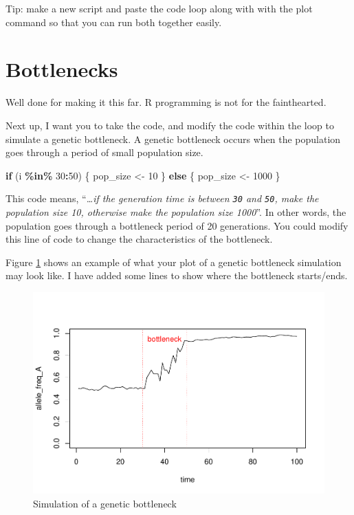 \documentclass[
  a4paper]{book}
\newenvironment{Shaded}{\begin{snugshade}}{\end{snugshade}}
\newcommand{\ControlFlowTok}[1]{\textcolor[rgb]{0.13,0.29,0.53}{\textbf{#1}}}
\newcommand{\DecValTok}[1]{\textcolor[rgb]{0.00,0.00,0.81}{#1}}
\newcommand{\NormalTok}[1]{#1}
\newcommand{\OtherTok}[1]{\textcolor[rgb]{0.56,0.35,0.01}{#1}}
\newcommand{\SpecialCharTok}[1]{\textcolor[rgb]{0.81,0.36,0.00}{\textbf{#1}}}
\begin{document}
\begin{do-something}
Tip: make a new script and paste the code loop along with with the plot
command so that you can run both together easily.
\end{do-something}

\section{Bottlenecks}\label{bottlenecks}

Well done for making it this far. R programming is not for the fainthearted.

Next up, I want you to take the code, and modify the code within the loop to simulate a genetic bottleneck. A genetic bottleneck occurs when the population goes through a period of small population size.

\begin{Shaded}
\begin{Highlighting}[]
\ControlFlowTok{if}\NormalTok{ (i }\SpecialCharTok{\%in\%} \DecValTok{30}\SpecialCharTok{:}\DecValTok{50}\NormalTok{) \{}
\NormalTok{  pop\_size }\OtherTok{\textless{}{-}} \DecValTok{10}
\NormalTok{\} }\ControlFlowTok{else}\NormalTok{ \{}
\NormalTok{  pop\_size }\OtherTok{\textless{}{-}} \DecValTok{1000}
\NormalTok{\}}
\end{Highlighting}
\end{Shaded}

This code means, ``\emph{\ldots if the generation time is between \texttt{30} and \texttt{50}, make the population size 10, otherwise make the population size 1000}''. In other words, the population goes through a bottleneck period of 20 generations. You could modify this line of code to change the characteristics of the bottleneck.

Figure \ref{fig:bottlenecksimulationplot} shows an example of what your plot of a genetic bottleneck simulation may look like. I have added some lines to show where the bottleneck starts/ends.

\begin{figure}
\centering
\includegraphics{BB512_files/figure-latex/bottlenecksimulationplot-1.pdf}
\caption{\label{fig:bottlenecksimulationplot}Simulation of a genetic bottleneck}
\end{figure}
\end{document}
